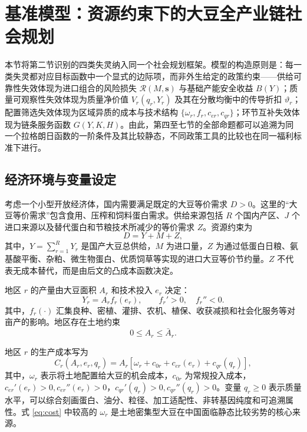 \documentclass[UTF8,zihao=-4,fontset=fandol]{ctexart}
\numberwithin{equation}{section}
\theoremstyle{definition}
\theoremstyle{remark}
\begin{document}
\section{基准模型：资源约束下的大豆全产业链社会规划}

本节将第二节识别的四类失灵纳入同一个社会规划框架。模型的构造原则是：每一类失灵都对应目标函数中一个显式的边际项，而非外生给定的政策约束——供给可靠性失效体现为进口组合的风险损失 $\mathcal{R}(M,\bm s)$ 与基础产能安全收益 $B(Y)$；质量可观察性失效体现为质量净价值 $V_r(q_r,Y_r)$ 及其在分散均衡中的传导折扣 $\vartheta_r$；配置筛选失效体现为区域异质的成本与技术结构 $\{\omega_r,f_r,c_{er},c_{qr}\}$；环节互补失效体现为链条服务函数 $G(Y,K,H)$。由此，第四至七节的全部命题都可以追溯为同一个拉格朗日函数的一阶条件及其比较静态，不同政策工具的比较也在同一福利标准下进行。

\subsection{经济环境与变量设定}

考虑一个小型开放经济体，国内需要满足既定的大豆等价需求 $D>0$。这里的“大豆等价需求”包含食用、压榨和饲料蛋白需求。供给来源包括 $R$ 个国内产区、$J$ 个进口来源以及替代蛋白和节粮技术所减少的等价需求 $Z$。资源约束为
\begin{equation}
 D=Y+M+Z,
 \label{eq:resource}
\end{equation}
其中，$Y=\sum_{r=1}^{R}Y_r$ 是国产大豆总供给，$M$ 为进口量，$Z$ 为通过低蛋白日粮、氨基酸平衡、杂粕、微生物蛋白、优质饲草等实现的进口大豆等价节约量。$Z$ 不代表无成本替代，而是由后文的凸成本函数决定。

地区 $r$ 的产量由大豆面积 $A_r$ 和技术投入 $e_r$ 决定：
\begin{equation}
 Y_r=A_r f_r(e_r), \qquad f_r'>0,\quad f_r''<0.
 \label{eq:production}
\end{equation}
其中，$f_r(\cdot)$ 汇集良种、密植、灌排、农机、植保、收获减损和社会化服务等对亩产的影响。地区存在土地约束
\begin{equation}
 0\leq A_r\leq \bar A_r.
 \label{eq:landconstraint}
\end{equation}

地区 $r$ 的生产成本写为
\begin{equation}
 C_r(A_r,e_r,q_r)=A_r\left[\omega_r+c_{0r}+c_{er}(e_r)+c_{qr}(q_r)\right],
 \label{eq:cost}
\end{equation}
其中，$\omega_r$ 表示将土地配置给大豆的机会成本，$c_{0r}$ 为常规投入成本，$c_{er}'(e_r)>0,c_{er}''(e_r)>0$，$c_{qr}'(q_r)>0,c_{qr}''(q_r)>0$。变量 $q_r\geq 0$ 表示质量水平，可以综合刻画蛋白、油分、粒径、加工适配性、非转基因纯度和可追溯属性。式 \eqref{eq:cost} 中较高的 $\omega_r$ 是土地密集型大豆在中国面临静态比较劣势的核心来源。
\end{document}
